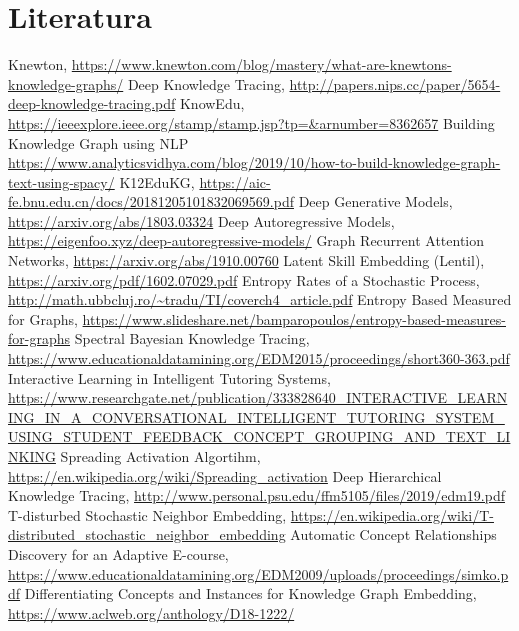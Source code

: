 \chapter{Literatura}
\renewcommand{\bibsection}{}
\begin{thebibliography}{9}
	
	 Knewton, \url{https://www.knewton.com/blog/mastery/what-are-knewtons-knowledge-graphs/}
	 Deep Knowledge Tracing, \url{ http://papers.nips.cc/paper/5654-deep-knowledge-tracing.pdf}
	 KnowEdu, \url{ https://ieeexplore.ieee.org/stamp/stamp.jsp?tp=&arnumber=8362657}
	 Building Knowledge Graph using NLP \url{https://www.analyticsvidhya.com/blog/2019/10/how-to-build-knowledge-graph-text-using-spacy/}
	 K12EduKG, \url{https://aic-fe.bnu.edu.cn/docs/20181205101832069569.pdf}
	 Deep Generative Models, \url{https://arxiv.org/abs/1803.03324}
	 Deep Autoregressive Models, \url{https://eigenfoo.xyz/deep-autoregressive-models/}
	 Graph Recurrent Attention Networks, \url{https://arxiv.org/abs/1910.00760}
	 Latent Skill Embedding (Lentil), \url{https://arxiv.org/pdf/1602.07029.pdf}
	 Entropy Rates of a Stochastic Process, \url{http://math.ubbcluj.ro/~tradu/TI/coverch4_article.pdf}
	 Entropy Based Measured for Graphs, \url{https://www.slideshare.net/bamparopoulos/entropy-based-measures-for-graphs}
	 Spectral Bayesian Knowledge Tracing, \url{https://www.educationaldatamining.org/EDM2015/proceedings/short360-363.pdf}
	 Interactive Learning in Intelligent Tutoring Systems, \url{https://www.researchgate.net/publication/333828640_INTERACTIVE_LEARNING_IN_A_CONVERSATIONAL_INTELLIGENT_TUTORING_SYSTEM_USING_STUDENT_FEEDBACK_CONCEPT_GROUPING_AND_TEXT_LINKING}
	 Spreading Activation Algortihm, \url{https://en.wikipedia.org/wiki/Spreading_activation}
	 Deep Hierarchical Knowledge Tracing, \url{http://www.personal.psu.edu/ffm5105/files/2019/edm19.pdf}
	 T-disturbed Stochastic Neighbor Embedding, \url{https://en.wikipedia.org/wiki/T-distributed_stochastic_neighbor_embedding}
	 Automatic Concept Relationships Discovery for an Adaptive E-course, \url{https://www.educationaldatamining.org/EDM2009/uploads/proceedings/simko.pdf}
	 Differentiating Concepts and Instances for Knowledge Graph Embedding, \url{https://www.aclweb.org/anthology/D18-1222/}

\end{thebibliography}
